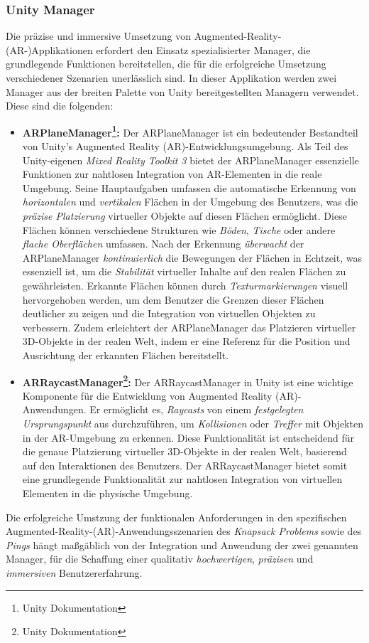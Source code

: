 \subsubsection{Unity Manager}
Die präzise und immersive Umsetzung von Augmented-Reality-(AR-)Applikationen erfordert den Einsatz spezialisierter Manager,
die grundlegende Funktionen bereitstellen, die für die erfolgreiche Umsetzung verschiedener Szenarien unerlässlich sind.
In dieser Applikation werden zwei Manager aus der breiten Palette von Unity bereitgestellten Managern verwendet. Diese
sind die folgenden:
\begin{itemize}
    \item \textbf{ARPlaneManager\footnote{Unity Dokumentation\cite{PlaneManager}}:}
    Der ARPlaneManager ist ein bedeutender Bestandteil von Unity's Augmented Reality (AR)-Entwicklungsumgebung. Als Teil
    des Unity-eigenen \textit{Mixed Reality Toolkit 3} bietet der ARPlaneManager essenzielle Funktionen zur nahtlosen
    Integration von AR-Elementen in die reale Umgebung. Seine Hauptaufgaben umfassen die automatische Erkennung von
    \textit{horizontalen} und \textit{vertikalen} Flächen in der Umgebung des Benutzers, was die \textit{präzise Platzierung}
    virtueller Objekte auf diesen Flächen ermöglicht. Diese Flächen können verschiedene Strukturen wie \textit{Böden},
    \textit{Tische} oder andere \textit{flache Oberflächen} umfassen. Nach der Erkennung \textit{überwacht} der ARPlaneManager
    \textit{kontinuierlich} die Bewegungen der Flächen in Echtzeit, was essenziell ist, um die \textit{Stabilität}
    virtueller Inhalte auf den realen Flächen zu gewährleisten. Erkannte Flächen können durch \textit{Texturmarkierungen}
    visuell hervorgehoben werden, um dem Benutzer die Grenzen dieser Flächen deutlicher zu zeigen und die Integration von
    virtuellen Objekten zu verbessern. Zudem erleichtert der ARPlaneManager das Platzieren virtueller 3D-Objekte in der
    realen Welt, indem er eine Referenz für die Position und Ausrichtung der erkannten Flächen bereitstellt.

    \item \textbf{ARRaycastManager\footnote{Unity Dokumentation\cite{RaycastManager}}:}
    Der ARRaycastManager in Unity ist eine wichtige Komponente für die Entwicklung von Augmented Reality (AR)-Anwendungen.
    Er ermöglicht es, \textit{Raycasts} von einem \textit{festgelegten Ursprungspunkt} aus durchzuführen, um \textit{Kollisionen}
    oder \textit{Treffer} mit Objekten in der AR-Umgebung zu erkennen. Diese Funktionalität ist entscheidend für die
    genaue Platzierung virtueller 3D-Objekte in der realen Welt, basierend auf den Interaktionen des Benutzers. Der
    ARRaycastManager bietet somit eine grundlegende Funktionalität zur nahtlosen Integration von virtuellen Elementen
    in die physische Umgebung.
\end{itemize}
Die erfolgreiche Umstzung der funktionalen Anforderungen in den spezifischen Augmented-Reality-(AR)-Anwendungsszenarien
des \textit{Knapsack Problems} sowie des \textit{Pings} hängt maßgäblich von der Integration und Anwendung der zwei
genannten Manager, für die Schaffung einer qualitativ \textit{hochwertigen}, \textit{präzisen} und \textit{immersiven}
Benutzererfahrung.

